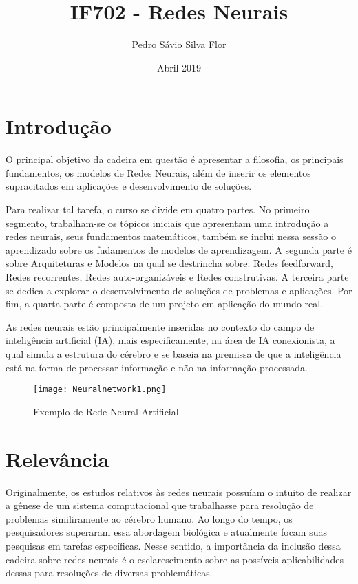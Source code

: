 \documentclass[10pt]{article}
\title{IF702 - Redes Neurais}
\author{Pedro Sávio Silva Flor }
\date{Abril 2019}
\begin{document}
\maketitle

\section{Introdução}

O principal objetivo da cadeira em questão é apresentar a filosofia, os principais fundamentos, os
modelos de Redes Neurais, além de inserir os elementos supracitados em  aplicações e desenvolvimento de soluções.\citep{perfilcurricular}

Para realizar tal tarefa, o curso se divide em quatro partes. No primeiro segmento, trabalham-se os tópicos iniciais que apresentam uma introdução a redes neurais, seus fundamentos matemáticos, também se inclui nessa sessão o aprendizado sobre os fudamentos de modelos de aprendizagem. A segunda parte é sobre Arquiteturas e Modelos na qual se destrincha sobre: Redes feedforward, Redes recorrentes, Redes auto-organizáveis e Redes construtivas. A terceira parte se dedica a explorar o  desenvolvimento de soluções de problemas e aplicações. Por fim, a quarta parte é composta de um projeto em aplicação do mundo real. \citep{cin.ufpe}

As redes neurais estão principalmente inseridas no contexto do campo de inteligência artificial (IA), mais especificamente, na área de IA conexionista, a qual simula a estrutura do cérebro e se baseia na premissa de que a inteligência está na forma de processar informação e não na informação processada. \citep{tecmundo}


\begin{figure}[h!]
\centering
\texttt{[image: Neuralnetwork1.png]}
\caption{Exemplo de Rede Neural Artificial \citep{Imagem}}
\label{fig:universe}
\end{figure}

\section{Relevância}
Originalmente, os estudos relativos às redes neurais possuíam o intuito de realizar a gênese de um sistema computacional que trabalhasse para resolução de problemas similiramente ao cérebro humano. Ao longo do tempo, os pesquisadores superaram essa abordagem biológica e atualmente focam suas pesquisas em tarefas específicas. Nesse sentido, a importância da inclusão dessa cadeira sobre redes neurais é o esclarescimento sobre as possíveis aplicabilidades dessas para resoluções de diversas problemáticas.
\end{document}
